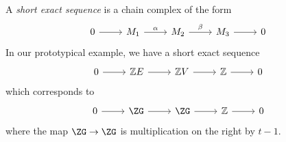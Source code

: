 \documentclass{article}
\begin{document}
A \emph{short exact sequence} is a chain complex of the form
\[\begin{tikzcd}
	0 & {M_1} & {M_2} & {M_3} & 0
	\arrow[from=1-1, to=1-2]
	\arrow["\alpha", from=1-2, to=1-3]
	\arrow["\beta", from=1-3, to=1-4]
	\arrow[from=1-4, to=1-5]
\end{tikzcd}\]
In our prototypical example, we have a short exact sequence
\[\begin{tikzcd}
	0 & {\Z E} & {\Z V} & {\Z } & 0
	\arrow[from=1-1, to=1-2]
	\arrow[from=1-2, to=1-3]
	\arrow[from=1-3, to=1-4]
	\arrow[from=1-4, to=1-5]
\end{tikzcd}\]
which corresponds to
\[\begin{tikzcd}
	0 & {\ZG} & {\ZG} & {\Z } & 0
	\arrow[from=1-4, to=1-5]
	\arrow[from=1-1, to=1-2]
	\arrow[from=1-2, to=1-3]
	\arrow[from=1-3, to=1-4]
\end{tikzcd}\]
where the map \(\ZG \to \ZG\) is multiplication on the right by \(t - 1\).
\end{document}
